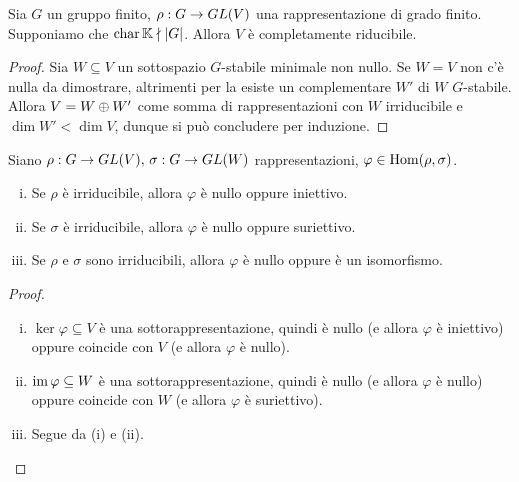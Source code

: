 \begin{proposition}
Sia $G$ un gruppo finito, $\rho:G\to GL(V)$ una rappresentazione di grado finito. Supponiamo che $\operatorname{char}\mathbb{K}\nmid|G|$. Allora $V$ è completamente riducibile.
\end{proposition}
\begin{proof}
Sia $W\subseteq V$ un sottospazio $G$-stabile minimale non nullo. Se $W=V$ non c'è nulla da dimostrare, altrimenti per la  esiste un complementare $W'$ di $W$ $G$-stabile. Allora $V=W\oplus W'$ come somma di rappresentazioni con $W$ irriducibile e $\dim W'<\dim V$, dunque si può concludere per induzione.
\end{proof}

\begin{proposition}
Siano $\rho:G\to GL(V),\,\allowbreak\sigma:G\to GL(W)$ rappresentazioni, $\varphi\in\operatorname{Hom}(\rho,\sigma)$.
\begin{enumerate}[(i)]
\item Se $\rho$ è irriducibile, allora $\varphi$ è nullo oppure iniettivo.
\item Se $\sigma$ è irriducibile, allora $\varphi$ è nullo oppure suriettivo.
\item Se $\rho$ e $\sigma$ sono irriducibili, allora $\varphi$ è nullo oppure è un isomorfismo.
\end{enumerate}
\end{proposition}
\begin{proof}\leavevmode
\begin{enumerate}[(i)]
\item $\ker\varphi\subseteq V$ è una sottorappresentazione, quindi è nullo (e allora $\varphi$ è iniettivo) oppure coincide con $V$ (e allora $\varphi$ è nullo).
\item $\operatorname{im}\varphi\subseteq W$ è una sottorappresentazione, quindi è nullo (e allora $\varphi$ è nullo) oppure coincide con $W$ (e allora $\varphi$ è suriettivo).
\item Segue da (i) e (ii).
\end{enumerate}
\end{proof}

